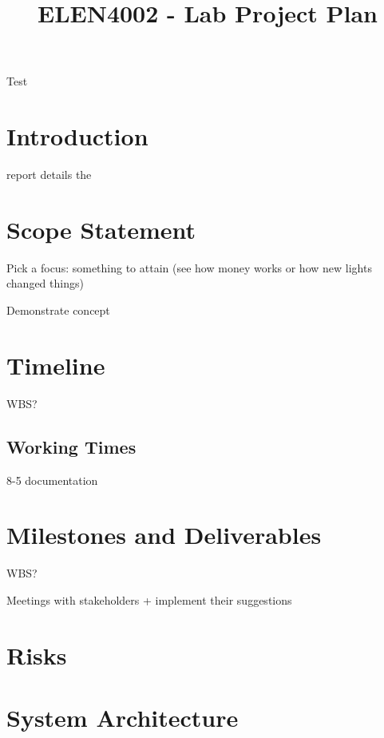 \documentclass[11pt]{IEEEtran}
\begin{document}
\author{}
\title{ELEN4002 - Lab Project Plan}
\maketitle
\begin{abstract}
    

\end{abstract}
\begin{IEEEkeywords} 
Test
\end{IEEEkeywords}
\pagestyle{plain}



\section{Introduction} \label{sec:Introduction}
 report details the 


\section{Scope Statement} \label{sec:ScopeStatement}
Pick a focus: something to attain (see how money works or how new lights changed things)

Demonstrate concept


\section{Timeline} \label{sec:Timeline}
WBS?

\subsection{Working Times} \label{sec:WorkingTimes}
8-5
documentation


\section{Milestones and Deliverables} \label{sec:MilestonesAndDeliverables}
WBS?

Meetings with stakeholders + implement their suggestions


\section{Risks} \label{sec:Risks}

\section{System Architecture} \label{sec:SystemArchitecture}
\end{document}
